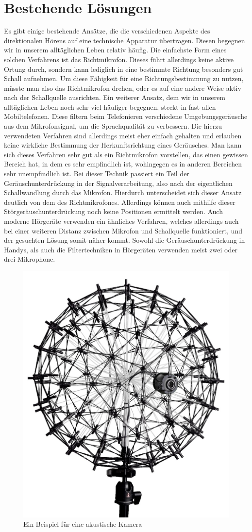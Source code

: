 \section{Bestehende Lösungen}
  Es gibt einige bestehende Ansätze, die die verschiedenen Aspekte des direktionalen Hörens auf eine technische Apparatur übertragen. Diesen begegnen wir in unserem alltäglichen Leben relativ häufig. Die einfachste Form eines solchen Verfahrens ist das Richtmikrofon. Dieses führt allerdings keine aktive Ortung durch, sondern kann lediglich in eine bestimmte Richtung besonders gut Schall aufnehmen. Um diese Fähigkeit für eine Richtungsbestimmung zu nutzen, müsste man also das Richtmikrofon drehen, oder es auf eine andere Weise aktiv nach der Schallquelle ausrichten. Ein weiterer Ansatz, dem wir in unserem alltäglichen Leben noch sehr viel häufiger begegnen, steckt in fast allen Mobiltelefonen. Diese filtern beim Telefonieren verschiedene Umgebungsgeräusche aus dem Mikrofonsignal, um die Sprachqualität zu verbessern. Die hierzu verwendeten Verfahren sind allerdings meist eher einfach gehalten und erlauben keine wirkliche Bestimmung der Herkunftsrichtung eines Geräusches. Man kann sich dieses Verfahren sehr gut als ein Richtmikrofon vorstellen, das einen gewissen Bereich hat, in dem es sehr empfindlich ist, wohingegen es in anderen Bereichen sehr unempfindlich ist. Bei dieser Technik passiert ein Teil der Geräuschunterdrückung in der Signalverarbeitung, also nach der eigentlichen Schallwandlung durch das Mikrofon. Hierdurch unterscheidet sich dieser Ansatz deutlich von dem des Richtmikrofones. Allerdings können auch mithilfe dieser Störgeräuschunterdrückung noch keine Positionen ermittelt werden. Auch moderne Hörgeräte verwenden ein ähnliches Verfahren, welches allerdings auch bei einer weiteren Distanz zwischen Mikrofon und Schallquelle funktioniert, und der gesuchten Lösung somit näher kommt. Sowohl die Geräuschunterdrückung in Handys, als auch die Filtertechniken in Hörgeräten verwenden meist zwei oder drei Mikrophone.
  \begin{figure}[H]
    \centering
    \includegraphics[width=0.35\linewidth]{img/akusticCamera}
    \caption{Ein Beispiel für eine akustische Kamera \cite{camera}}
    \label{fig:camera}
  \end{figure}
